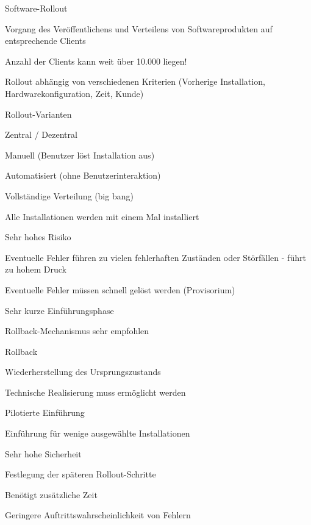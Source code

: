 \documentclass[a4paper]{article}
\begin{document}
\begin{multicols}{3}
  Software-Rollout
  \begin{itemize*}
    \item Vorgang des Veröffentlichens und Verteilens von Softwareprodukten auf entsprechende Clients
    \item Anzahl der Clients kann weit über 10.000 liegen!
    \item Rollout abhängig von verschiedenen Kriterien (Vorherige Installation, Hardwarekonfiguration, Zeit, Kunde)
    \item Rollout-Varianten
    \begin{itemize*}
      \item Zentral / Dezentral
      \item Manuell (Benutzer löst Installation aus)
      \item Automatisiert (ohne Benutzerinteraktion)
    \end{itemize*}
  \end{itemize*}

  Vollständige Verteilung (big bang)
  \begin{itemize*}
    \item Alle Installationen werden mit einem Mal installiert
    \item Sehr hohes Risiko
    \item Eventuelle Fehler führen zu vielen fehlerhaften Zuständen oder Störfällen - führt zu hohem Druck
    \item Eventuelle Fehler müssen schnell gelöst werden (Provisorium)
    \item Sehr kurze Einführungsphase
    \item Rollback-Mechanismus sehr empfohlen
  \end{itemize*}

  Rollback
  \begin{itemize*}
    \item Wiederherstellung des Ursprungszustands
    \item Technische Realisierung muss ermöglicht werden
  \end{itemize*}

  Pilotierte Einführung
  \begin{itemize*}
    \item Einführung für wenige ausgewählte Installationen
    \item Sehr hohe Sicherheit
    \item Festlegung der späteren Rollout-Schritte
    \item Benötigt zusätzliche Zeit
    \item Geringere Auftrittswahrscheinlichkeit von Fehlern
  \end{itemize*}


\end{multicols}
\end{document}

